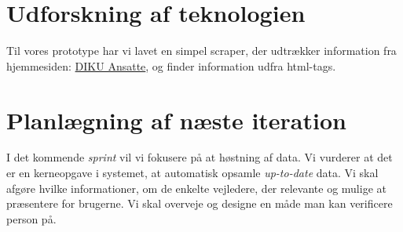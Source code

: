 \documentclass[11pt]{article}
\begin{document}
\section{Udforskning af teknologien}

Til vores prototype har vi lavet en simpel scraper, der udtrækker information fra hjemmesiden: \href{http://www.diku.dk/Ansatte}{DIKU Ansatte}, og finder information udfra html-tags.

\section{Planlægning af næste iteration}
I det kommende \textit{sprint} vil vi fokusere på at høstning af data. Vi vurderer at det er en kerneopgave i systemet, at automatisk opsamle \textit{up-to-date} data. Vi skal afgøre hvilke informationer, om de enkelte vejledere, der relevante og mulige at præsentere for brugerne.
Vi skal overveje og designe en måde man kan verificere person på.
\end{document}
